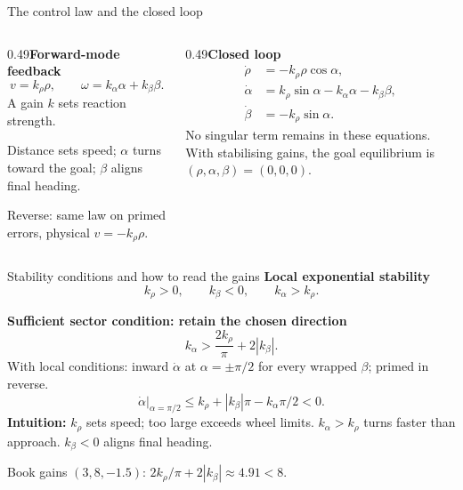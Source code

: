 \documentclass[aspectratio=169]{beamer}
\begin{document}
\begin{frame}[t]{The control law and the closed loop}
\small
\setlength{\abovedisplayskip}{1mm}\setlength{\belowdisplayskip}{1mm}
\setlength{\abovedisplayshortskip}{0pt}\setlength{\belowdisplayshortskip}{0pt}
\begin{columns}[T,onlytextwidth]\begin{column}{0.49\textwidth}\textbf{Forward-mode feedback}\[v=k_\rho\rho,\qquad\omega=k_\alpha\alpha+k_\beta\beta.\]A gain $k$ sets reaction strength.\par\vspace{2mm}Distance sets speed; $\alpha$ turns toward the goal; $\beta$ aligns final heading.\par\vspace{2mm}Reverse: same law on primed errors, physical $v=-k_\rho\rho$.\end{column}\begin{column}{0.49\textwidth}\textbf{Closed loop}\[\begin{aligned}\dot\rho&=-k_\rho\rho\cos\alpha,\\\dot\alpha&=k_\rho\sin\alpha-k_\alpha\alpha-k_\beta\beta,\\\dot\beta&=-k_\rho\sin\alpha.\end{aligned}\]No singular term remains in these equations. With stabilising gains, the goal equilibrium is $(\rho,\alpha,\beta)=(0,0,0)$.\end{column}\end{columns}
\end{frame}

\begin{frame}[t]{Stability conditions and how to read the gains}
\small
\setlength{\abovedisplayskip}{1mm}\setlength{\belowdisplayskip}{1mm}\setlength{\abovedisplayshortskip}{0pt}\setlength{\belowdisplayshortskip}{0pt}
\textbf{Local exponential stability}
\[k_\rho>0,\qquad k_\beta<0,\qquad k_\alpha>k_\rho.\]
\vspace{1.5mm}\par\textbf{Sufficient sector condition: retain the chosen direction}
\[k_\alpha>\frac{2k_\rho}{\pi}+2|k_\beta|.\]
With local conditions: inward $\dot\alpha$ at $\alpha=\pm\pi/2$ for every wrapped $\beta$; primed in reverse.
\[\left.\dot\alpha\right|_{\alpha=\pi/2}\leq k_\rho+|k_\beta|\pi-k_\alpha\pi/2<0.\]
\textbf{Intuition:} $k_\rho$ sets speed; too large exceeds wheel limits. $k_\alpha>k_\rho$ turns faster than approach. $k_\beta<0$ aligns final heading.\par\vspace{1.5mm}
Book gains $(3,8,-1.5)$: $2k_\rho/\pi+2|k_\beta|\approx4.91<8$.
\end{frame}
\end{document}
